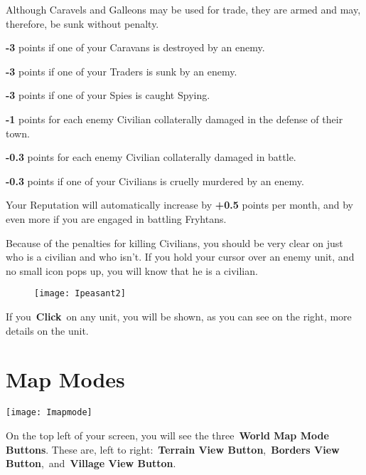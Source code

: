 \begin{adjustwidth}{1cm}{}
Although Caravels and Galleons may be used for trade, they are armed and may, therefore, be sunk without penalty.

\textbf{-3} points if one of your Caravans is destroyed by an enemy.

\textbf{-3} points if one of your Traders is sunk by an enemy.

\textbf{-3} points if one of your Spies is caught Spying.

\textbf{-1} points for each enemy Civilian collaterally damaged in the defense of their town.

\textbf{-0.3} points for each enemy Civilian collaterally damaged in battle.

\textbf{-0.3} points if one of your Civilians is cruelly murdered by an enemy.

Your Reputation will automatically increase by \textbf{+0.5} points per month, and by even more if you are engaged in battling Fryhtans.
\end{adjustwidth}

Because of the penalties for killing Civilians, you should be very clear on just who is a civilian and who isn’t. If you hold your cursor over an enemy unit, and no small icon pops up, you will know that he is a civilian.

\begin{wrapfigure}{r}{0.5\textwidth}
\vspace{-20pt}
	\begin{center}
		\texttt{[image: Ipeasant2]}
\end{center}
\vspace{-20pt}
\end{wrapfigure}

If you \textbf{Click} on any unit, you will be shown, as you can see on the right, more details on the unit.


\section{Map Modes}

\begin{center}
	\texttt{[image: Imapmode]}
\end{center}

On the top left of your screen, you will see the three \textbf{World Map Mode Buttons}. These are, left to right: \textbf{Terrain View Button}, \textbf{Borders View Button}, and \textbf{Village View Button}.

